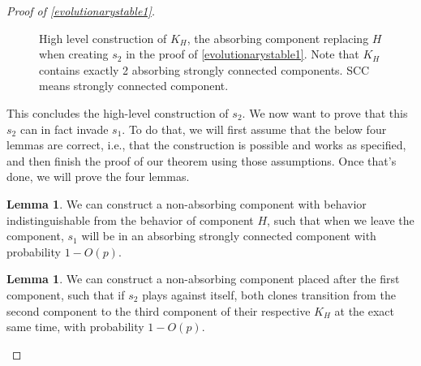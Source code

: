 \documentclass[11pt]{amsart}
\theoremstyle{definition}
\newtheorem{lemma}[theorem]{Lemma}
\theoremstyle{remark}
\begin{document}
\begin{proof}[Proof of \cref{evolutionarystable1}]
\begin{figure}
        \caption{High level construction of $K_H$, the absorbing component replacing $H$ when creating $s_2$ in the proof of \cref{evolutionarystable1}. Note that $K_H$ contains exactly 2 absorbing strongly connected components. SCC means strongly connected component.}
        \label{c2flowchart}
      \end{figure}
      
      This concludes the high-level construction of $s_2$. We now want to prove that this $s_2$ can in fact invade $s_1$. To do that, we will first assume that the below four lemmas are correct, i.e., that the construction is possible and works as specified, and then finish the proof of our theorem using those assumptions. Once that's done, we will prove the four lemmas.

      \begin{lemma}
        \label{claimcanwaitfors1}
        We can construct a non-absorbing component with behavior indistinguishable from the behavior of component $H$, such that when we leave the component, $s_1$ will be in an absorbing strongly connected component with probability $1 - O(p)$.
      \end{lemma}

      \begin{lemma}
        \label{claimcansyncs2}
        We can construct a non-absorbing component placed after the first component, such that if $s_2$ plays against itself, both clones transition from the second component to the third component of their respective $K_H$ at the exact same time, with probability $1 - O(p)$.
      \end{lemma}


\end{proof}
\end{document}
